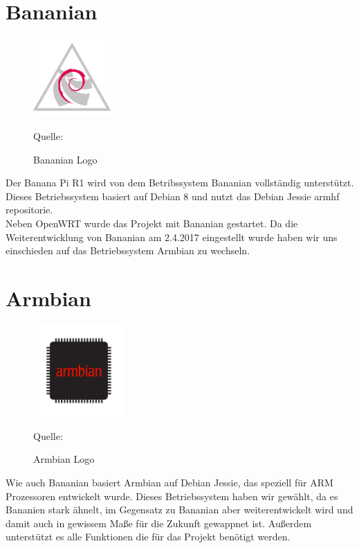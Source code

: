 \newpage
\section{Bananian}
\begin{figure}
\centering
\includegraphics[width=3cm]{pictures/Jakob/Bananian}
\caption{Bananian Logo}
Quelle: \cite{bananian1}
\end{figure}
Der Banana Pi R1 wird von dem Betribssystem Bananian vollständig unterstützt. Dieses Betriebssystem basiert auf Debian 8 und nutzt das Debian Jessie armhf repositorie. \cite{bananian}\\
Neben OpenWRT wurde das Projekt mit Bananian gestartet. Da die Weiterentwicklung von Bananian am 2.4.2017 eingestellt wurde haben wir uns einschieden auf das Betriebssystem Armbian zu wechseln. \cite{bananian2}

\section{Armbian}
\begin{figure}
\centering
\includegraphics[width=3.5cm]{pictures/Jakob/Armbian}
\caption{Armbian Logo}
Quelle: \cite{armbian}
\end{figure}
Wie auch Bananian basiert Armbian auf Debian Jessie, das speziell für ARM Prozessoren entwickelt wurde. Dieses Betriebssystem haben wir gewählt, da es Bananien stark ähnelt, im Gegensatz zu Bananian aber weiterentwickelt wird und damit auch in gewissem Maße für die Zukunft gewappnet ist. Außerdem unterstützt es alle Funktionen die für das Projekt benötigt werden. \cite{armbian1}







